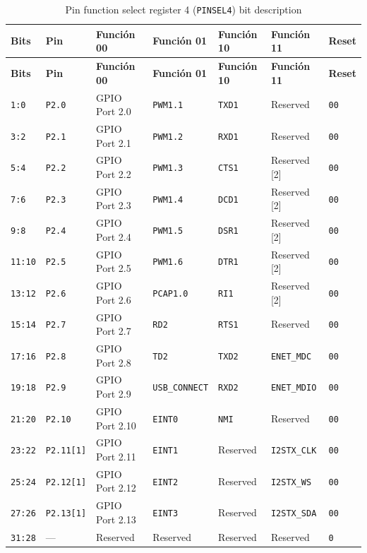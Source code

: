 \begin{longtable}{|>{\raggedright\arraybackslash}p{}|>{\raggedright\arraybackslash}p{}|>{\raggedright\arraybackslash}p{}|>{\raggedright\arraybackslash}p{}|>{\raggedright\arraybackslash}p{}|>{\raggedright\arraybackslash}p{}|>{\centering\arraybackslash}p{}|}
\caption{Pin function select register 4 (\texttt{PINSEL4}) bit description}\\
\hline
\textbf{Bits} & \textbf{Pin} & \textbf{Función 00} & \textbf{Función 01} & \textbf{Función 10} & \textbf{Función 11} & \textbf{Reset} \\
\hline
\endfirsthead
\hline
\textbf{Bits} & \textbf{Pin} & \textbf{Función 00} & \textbf{Función 01} & \textbf{Función 10} & \textbf{Función 11} & \textbf{Reset} \\
\hline
\endhead
\texttt{1:0} & \texttt{P2.0} & GPIO Port 2.0 & \texttt{PWM1.1} & \texttt{TXD1} & Reserved & \texttt{00} \\
\hline
\texttt{3:2} & \texttt{P2.1} & GPIO Port 2.1 & \texttt{PWM1.2} & \texttt{RXD1} & Reserved & \texttt{00} \\
\hline
\texttt{5:4} & \texttt{P2.2} & GPIO Port 2.2 & \texttt{PWM1.3} & \texttt{CTS1} & Reserved [2] & \texttt{00} \\
\hline
\texttt{7:6} & \texttt{P2.3} & GPIO Port 2.3 & \texttt{PWM1.4} & \texttt{DCD1} & Reserved [2] & \texttt{00} \\
\hline
\texttt{9:8} & \texttt{P2.4} & GPIO Port 2.4 & \texttt{PWM1.5} & \texttt{DSR1} & Reserved [2] & \texttt{00} \\
\hline
\texttt{11:10} & \texttt{P2.5} & GPIO Port 2.5 & \texttt{PWM1.6} & \texttt{DTR1} & Reserved [2] & \texttt{00} \\
\hline
\texttt{13:12} & \texttt{P2.6} & GPIO Port 2.6 & \texttt{PCAP1.0} & \texttt{RI1} & Reserved [2] & \texttt{00} \\
\hline
\texttt{15:14} & \texttt{P2.7} & GPIO Port 2.7 & \texttt{RD2} & \texttt{RTS1} & Reserved & \texttt{00} \\
\hline
\texttt{17:16} & \texttt{P2.8} & GPIO Port 2.8 & \texttt{TD2} & \texttt{TXD2} & \texttt{ENET\_MDC} & \texttt{00} \\
\hline
\texttt{19:18} & \texttt{P2.9} & GPIO Port 2.9 & \texttt{USB\_CONNECT} & \texttt{RXD2} & \texttt{ENET\_MDIO} & \texttt{00} \\
\hline
\texttt{21:20} & \texttt{P2.10} & GPIO Port 2.10 & \texttt{EINT0} & \texttt{NMI} & Reserved & \texttt{00} \\
\hline
\texttt{23:22} & \texttt{P2.11[1]} & GPIO Port 2.11 & \texttt{EINT1} & Reserved & \texttt{I2STX\_CLK} & \texttt{00} \\
\hline
\texttt{25:24} & \texttt{P2.12[1]} & GPIO Port 2.12 & \texttt{EINT2} & Reserved & \texttt{I2STX\_WS} & \texttt{00} \\
\hline
\texttt{27:26} & \texttt{P2.13[1]} & GPIO Port 2.13 & \texttt{EINT3} & Reserved & \texttt{I2STX\_SDA} & \texttt{00} \\
\hline
\texttt{31:28} & --- & Reserved & Reserved & Reserved & Reserved & \texttt{0} \\
\hline
\end{longtable}
